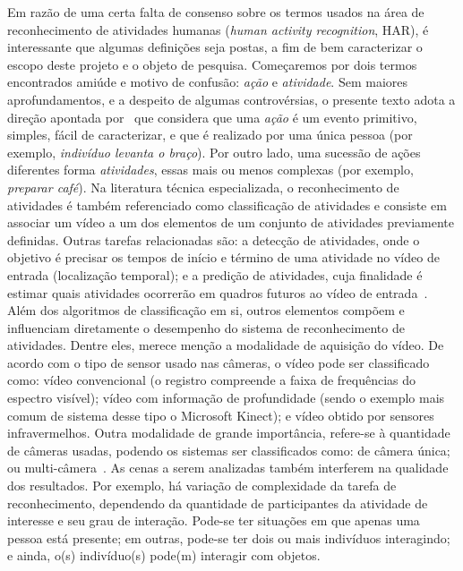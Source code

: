 \nocite{jegham-2020, hussain-2020,yao-2019,kongr-2018,herath-2017}
Em razão de uma certa falta de consenso sobre os termos usados na área de reconhecimento de atividades humanas (\emph{human activity recognition}, HAR), é interessante que algumas definições seja postas, a fim de bem caracterizar o escopo deste projeto e o objeto de pesquisa. 
%
Começaremos por dois termos encontrados amiúde e motivo de confusão: \emph{ação} e \emph{atividade}. Sem maiores aprofundamentos, e a despeito de algumas controvérsias, o presente texto adota a direção apontada por~\textcite{herath-2017} que considera que uma \emph{ação} é um evento primitivo, simples, fácil de caracterizar, e que é realizado por uma única pessoa (por exemplo, \emph{indivíduo levanta o braço}). Por outro lado, uma sucessão de ações diferentes forma \emph{atividades}, essas mais ou menos complexas (por exemplo, \emph{preparar café}).
%
Na literatura técnica especializada, o reconhecimento de atividades é também referenciado como classificação de atividades e consiste em associar um vídeo a um dos elementos de um conjunto de atividades previamente definidas. Outras tarefas relacionadas são: a detecção de atividades, onde o objetivo é precisar os tempos de início e término de uma atividade no vídeo de entrada (localização temporal); e a predição de atividades, cuja finalidade é estimar quais atividades ocorrerão em quadros futuros ao  vídeo de entrada~\parencite{yao-2019}.%
%
Além dos algoritmos de classificação em si, outros elementos compõem e influenciam diretamente o desempenho do sistema de reconhecimento de atividades. Dentre eles, merece menção a modalidade de aquisição do vídeo. De acordo com o tipo de sensor usado nas câmeras, o vídeo pode ser classificado como: vídeo convencional (o registro compreende a faixa de frequências do espectro visível); vídeo com informação de profundidade (sendo o exemplo mais comum de sistema desse tipo o Microsoft Kinect); e vídeo obtido por sensores infravermelhos. Outra modalidade de grande importância, refere-se à quantidade de câmeras usadas, podendo os sistemas ser classificados como: de câmera única; ou multi-câmera~\parencite{yao-2019}.
%
As cenas a serem analizadas também interferem na qualidade dos resultados. Por exemplo, há variação de complexidade da tarefa de reconhecimento, dependendo da quantidade de participantes da atividade de interesse e seu grau de interação. Pode-se ter situações em que apenas uma pessoa está presente; em outras, pode-se ter dois ou mais indivíduos interagindo; e ainda, o(s) indivíduo(s) pode(m) interagir com objetos.
